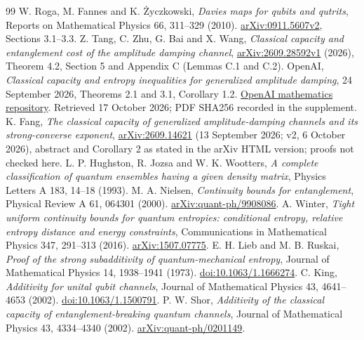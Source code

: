 \documentclass[11pt]{article}
\begin{document}
\begin{thebibliography}{99}
\small\setlength{\itemsep}{3pt}
 W. Roga, M. Fannes and K. \.{Z}yczkowski, \emph{Davies maps for qubits and qutrits}, Reports on Mathematical Physics 66, 311--329 (2010). \href{https://arxiv.org/abs/0911.5607}{arXiv:0911.5607v2}, Sections 3.1--3.3.
 Z. Tang, C. Zhu, G. Bai and X. Wang, \emph{Classical capacity and entanglement cost of the amplitude damping channel}, \href{https://arxiv.org/abs/2609.28592}{arXiv:2609.28592v1} (2026), Theorem 4.2, Section 5 and Appendix C (Lemmas C.1 and C.2).
 OpenAI, \emph{Classical capacity and entropy inequalities for generalized amplitude damping}, 24 September 2026, Theorems 2.1 and 3.1, Corollary 1.2. \href{https://github.com/openai/math/tree/main/preprints/Classical-capacity-and-entropy-inequalities-for-generalized-amplitude-damping-September-24-2026}{OpenAI mathematics repository}. Retrieved 17 October 2026; PDF SHA256 recorded in the supplement.
 K. Fang, \emph{The classical capacity of generalized amplitude-damping channels and its strong-converse exponent}, \href{https://arxiv.org/abs/2609.14621}{arXiv:2609.14621} (13 September 2026; v2, 6 October 2026), abstract and Corollary 2 as stated in the arXiv HTML version; proofs not checked here.
 L. P. Hughston, R. Jozsa and W. K. Wootters, \emph{A complete classification of quantum ensembles having a given density matrix}, Physics Letters A 183, 14--18 (1993).
 M. A. Nielsen, \emph{Continuity bounds for entanglement}, Physical Review A 61, 064301 (2000). \href{https://arxiv.org/abs/quant-ph/9908086}{arXiv:quant-ph/9908086}.
 A. Winter, \emph{Tight uniform continuity bounds for quantum entropies: conditional entropy, relative entropy distance and energy constraints}, Communications in Mathematical Physics 347, 291--313 (2016). \href{https://arxiv.org/abs/1507.07775}{arXiv:1507.07775}.
 E. H. Lieb and M. B. Ruskai, \emph{Proof of the strong subadditivity of quantum-mechanical entropy}, Journal of Mathematical Physics 14, 1938--1941 (1973). \href{https://doi.org/10.1063/1.1666274}{doi:10.1063/1.1666274}.
 C. King, \emph{Additivity for unital qubit channels}, Journal of Mathematical Physics 43, 4641--4653 (2002). \href{https://doi.org/10.1063/1.1500791}{doi:10.1063/1.1500791}.
 P. W. Shor, \emph{Additivity of the classical capacity of entanglement-breaking quantum channels}, Journal of Mathematical Physics 43, 4334--4340 (2002). \href{https://arxiv.org/abs/quant-ph/0201149}{arXiv:quant-ph/0201149}.

\end{thebibliography}
\end{document}
